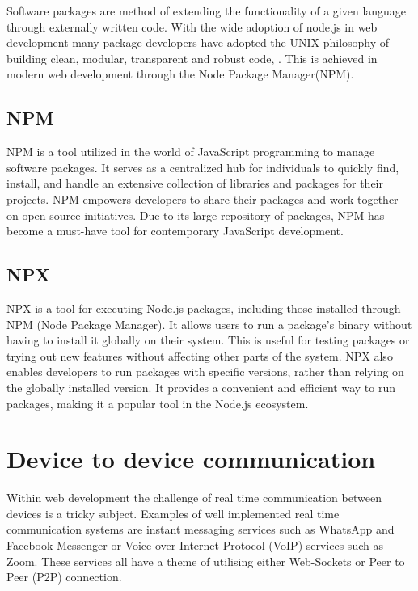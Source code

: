 \documentclass{l4proj}
\begin{document}
Software packages are method of extending the functionality of a given language through externally written code. With the wide adoption of node.js in web development many package developers have adopted the UNIX philosophy of building clean, modular, transparent and robust code, \cite{TheArtOfUNIXProgramming}. This is achieved in modern web development through the Node Package Manager(NPM).

\subsection{NPM}
\text NPM is a tool utilized in the world of JavaScript programming to manage software packages. It serves as a centralized hub for individuals to quickly find, install, and handle an extensive collection of libraries and packages for their projects. NPM empowers developers to share their packages and work together on open-source initiatives. Due to its large repository of packages, NPM has become a must-have tool for contemporary JavaScript development.

\subsection{NPX}
\text NPX is a tool for executing Node.js packages, including those installed through NPM (Node Package Manager). It allows users to run a package's binary without having to install it globally on their system. This is useful for testing packages or trying out new features without affecting other parts of the system. NPX also enables developers to run packages with specific versions, rather than relying on the globally installed version. It provides a convenient and efficient way to run packages, making it a popular tool in the Node.js ecosystem.

\section{Device to device communication}

Within web development the challenge of real time communication between devices is a tricky subject. Examples of well implemented real time communication systems are instant messaging services such as WhatsApp and Facebook Messenger or Voice over Internet Protocol (VoIP) services such as Zoom. These services all have a theme of utilising either Web-Sockets or Peer to Peer (P2P) connection.
\end{document}
